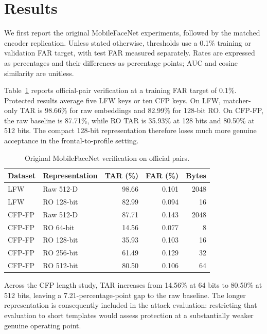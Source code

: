 \section{Results}\label{sec:results}
We first report the original MobileFaceNet experiments, followed by the matched encoder replication. Unless stated otherwise, thresholds use a 0.1\% training or validation FAR target, with test FAR measured separately. Rates are expressed as percentages and their differences as percentage points; AUC and cosine similarity are unitless.


Table~\ref{tab:official} reports official-pair verification at a training FAR target of 0.1\%. Protected results average five LFW keys or ten CFP keys. On LFW, matcher-only TAR is 98.66\% for raw embeddings and 82.99\% for 128-bit RO. On CFP-FP, the raw baseline is 87.71\%, while RO TAR is 35.93\% at 128 bits and 80.50\% at 512 bits. The compact 128-bit representation therefore loses much more genuine acceptance in the frontal-to-profile setting.

\begin{table}[t]
\caption{Original MobileFaceNet verification on official pairs.}
\label{tab:official}\centering\small
\begin{tabular}{@{}llrrr@{}}\toprule
Dataset & Representation & TAR (\%) & FAR (\%) & Bytes\\\midrule
LFW & Raw 512-D & 98.66 & 0.101 & 2048\\
LFW & RO 128-bit & 82.99 & 0.094 & 16\\
CFP-FP & Raw 512-D & 87.71 & 0.143 & 2048\\
CFP-FP & RO 64-bit & 14.56 & 0.077 & 8\\
CFP-FP & RO 128-bit & 35.93 & 0.103 & 16\\
CFP-FP & RO 256-bit & 61.49 & 0.129 & 32\\
CFP-FP & RO 512-bit & 80.50 & 0.106 & 64\\\bottomrule
\end{tabular}
\end{table}

Across the CFP length study, TAR increases from 14.56\% at 64 bits to 80.50\% at 512 bits, leaving a 7.21-percentage-point gap to the raw baseline. The longer representation is consequently included in the attack evaluation: restricting that evaluation to short templates would assess protection at a substantially weaker genuine operating point.

